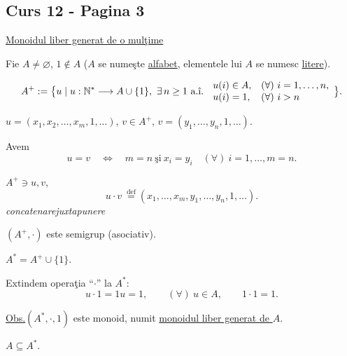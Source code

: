 
\subsection*{Curs 12 - Pagina 3}

\noindent\underline{Monoidul liber generat de o mul\c{t}ime}

\bigskip
\noindent Fie $A\neq\varnothing$, $1\notin A$ ($A$ se nume\c{s}te \underline{alfabet},
 elementele lui $A$ se numesc \underline{litere}).

\bigskip
\noindent
\[
A^{+}:=\bigl\{u\mid u:\mathbb{N}^{*}\longrightarrow A\cup\{1\},\ \exists\, n\geq 1
\text{ a.\^{\i}. }
\begin{array}{ll}
 u(i)\in A, & (\forall)\ i=1,\ldots,n,\\
 u(i)=1, & (\forall)\ i>n
\end{array}
\bigr\}.
\]

\noindent $u=(x_1,x_2,\ldots,x_m,1,\ldots)$,
\qquad $v\in A^{+}$, $v=(y_1,\ldots,y_n,1,\ldots)$.

\medskip
\noindent Avem
\[
u=v\quad\Longleftrightarrow\quad m=n\ \text{\c{s}i}\ x_i=y_i
\quad(\forall)\ i=1,\ldots,m=n.
\]

\bigskip
\noindent $A^{+}\ni u,v$,
\[
u\cdot v\ \overset{\mathrm{def}}{=}
(x_1,\ldots,x_m,y_1,\ldots,y_n,1,\ldots).
\]
\noindent\hspace*{3em}\textit{concatenare}\hspace{5em}\textit{juxtapunere}

\bigskip
\noindent $(A^{+},\cdot)$ este semigrup (asociativ).

\bigskip
\noindent $A^{*}=A^{+}\cup\{1\}$.

\noindent Extindem opera\c{t}ia ``$\cdot$'' la $A^{*}$:
\[
u\cdot 1=1u=1,\qquad (\forall)\ u\in A, \qquad 1\cdot 1=1.
\]

\bigskip
\noindent\underline{Obs.}\quad $(A^{*},\cdot,1)$ este monoid,
numit \underline{monoidul liber generat de $A$}.

\medskip
\noindent $A\subseteq A^{*}$.

